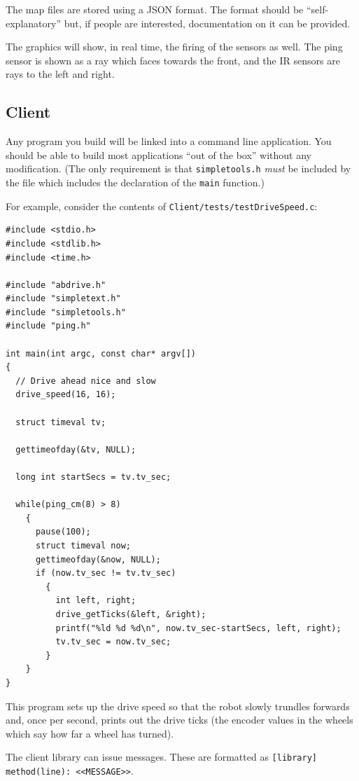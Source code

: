 \documentclass[a4paper]{article}
\begin{document}
The map files are stored using a JSON format. The format should be
``self-explanatory'' but, if people are interested, documentation on it can be
provided.

The graphics will show, in real time, the firing of the sensors as well. The
ping sensor is shown as a ray which faces towards the front, and the IR sensors
are rays to the left and right.

\subsection{Client}

Any program you build will be linked into a command line
application. You should be able to build most applications ``out of
the box'' without any modification. (The only requirement is that
\verb+simpletools.h+ \emph{must\/} be included by the file which
includes the declaration of the \verb+main+ function.)

For example, consider the contents of
\verb+Client/tests/testDriveSpeed.c+:

\lstset{language=C++} 

\begin{verbatim}
#include <stdio.h>
#include <stdlib.h>
#include <time.h>

#include "abdrive.h"
#include "simpletext.h"
#include "simpletools.h"
#include "ping.h"

int main(int argc, const char* argv[])
{
  // Drive ahead nice and slow
  drive_speed(16, 16);

  struct timeval tv;
  
  gettimeofday(&tv, NULL);

  long int startSecs = tv.tv_sec;
  
  while(ping_cm(8) > 8)
    {
      pause(100);
      struct timeval now;
      gettimeofday(&now, NULL);
      if (now.tv_sec != tv.tv_sec)
        {
          int left, right;
          drive_getTicks(&left, &right);
          printf("%ld %d %d\n", now.tv_sec-startSecs, left, right);
          tv.tv_sec = now.tv_sec;
        }
    }
}
\end{verbatim}

This program sets up the drive speed so that the robot slowly trundles forwards
and, once per second, prints out the drive ticks (the encoder values in the
wheels which say how far a wheel has turned).

The client library can issue messages. These are formatted as
\verb+[library] method(line): <<MESSAGE>>+.
\end{document}
